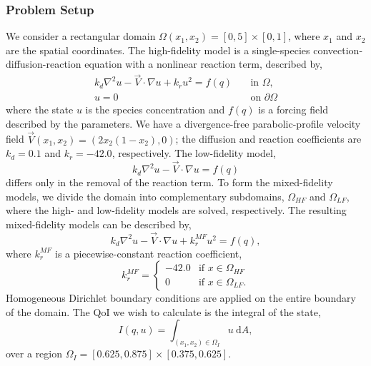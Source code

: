 \subsubsection{Problem Setup} \label{sec:cdvcdrSetup}
%
We consider a rectangular domain $\Omega(x_1,x_2)=[0,5]\times[0,1]$, where $x_1$ and $x_2$ are the spatial coordinates. The high-fidelity model is a single-species convection-diffusion-reaction equation with a nonlinear reaction term, described by,
%
\begin{subequations}
\label{eq:cdvcdrHF}
\begin{align}
k_d\nabla^2 u - \vec{V}\cdot\nabla u + k_ru^2 = f(q) \quad &\text{in } \Omega, \label{eq:cdvcdrHF_int} \\
u = 0 \quad &\text{on } \partial \Omega \label{eq:cdvcdrHF_bdry}
\end{align} 
\end{subequations}
%
where the state $u$ is the species concentration and $f(q)$ is a forcing field described by the parameters. We have a divergence-free parabolic-profile velocity field $\vec{V}(x_1,x_2) = (2x_2(1-x_2),0)$; the diffusion and reaction coefficients are $k_d = 0.1$ and $k_r = -42.0$, respectively. The low-fidelity model,
%
\begin{equation}
k_d\nabla^2 u - \vec{V}\cdot\nabla u = f(q)
\end{equation}
%
differs only in the removal of the reaction term. To form the mixed-fidelity models, we divide the domain into complementary subdomains, $\Omega_{HF}$ and $\Omega_{LF}$, where the high- and low-fidelity models are solved, respectively. The resulting mixed-fidelity models can be described by, 
%
\begin{equation}
k_d\nabla^2 u - \vec{V}\cdot\nabla u + k^{MF}_ru^2= f(q),
\end{equation}
%
where $k^{MF}_r$ is a piecewise-constant reaction coefficient,
%
\begin{equation}
k^{MF}_r=
\begin{cases}
-42.0 & \textrm{if }x\in\Omega_{HF} \\
0 & \textrm{if }x\in\Omega_{LF}.
\end{cases}
\end{equation}
%
Homogeneous Dirichlet boundary conditions are applied on the entire boundary of the domain. The QoI we wish to calculate is the integral of the state,
%
\begin{equation}
I(q,u)=\int_{(x_1,x_2)\in \Omega_I} u \:\textrm{d}A,
\end{equation}
%
over a region $\Omega_I=[0.625,0.875]\times[0.375,0.625]$. 

